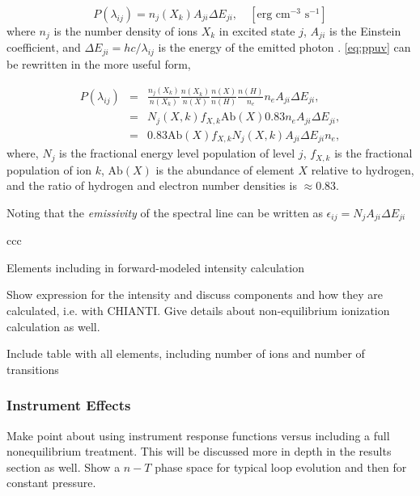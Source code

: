 \documentclass[modern,linenumbers]{aastex62}
\begin{document}
\begin{equation}
    \label{eq:ppuv}
    P(\lambda_{ij}) = n_j(X_k)A_{ji}\Delta E_{ji},\quad[\text{erg cm}^{-3}\text{ s}^{-1}]
\end{equation}
where $n_j$ is the number density of ions $X_k$ in excited state $j$, $A_{ji}$ is the Einstein coefficient, and $\Delta E_{ji}=hc/\lambda_{ij}$ is the energy of the emitted photon  \citep[see][]{mason_spectroscopic_1994,bradshaw_collisional_2013}. \autoref{eq:ppuv} can be rewritten in the more useful form,

\begin{eqnarray*}
    P(\lambda_{ij}) &=& \frac{n_j(X_k)}{n(X_k)}\frac{n(X_k)}{n(X)}\frac{n(X)}{n(H)}\frac{n(H)}{n_e}n_eA_{ji}\Delta E_{ji}, \\
    &=& N_j(X,k) f_{X,k} \mathrm{Ab}(X) 0.83 n_e A_{ji} \Delta E_{ji}, \\
    &=& 0.83 \mathrm{Ab}(X) f_{X,k} N_j(X,k) A_{ji} \Delta E_{ji} n_e,
\end{eqnarray*}
where, $N_j$ is the fractional energy level population of level $j$, $f_{X,k}$ is the fractional population of ion $k$, $\mathrm{Ab}(X)$ is the abundance of element $X$ relative to hydrogen, and the ratio of hydrogen and electron number densities is $\approx0.83$. 

Noting that the \textit{emissivity} of the spectral line can be written as $\epsilon_{ij}=N_j A_{ji} \Delta E_{ji}$
\begin{deluxetable}{ccc}
    \caption{Elements including in forward-modeled intensity calculation\label{tab:element_table}}
    \startdata
    \enddata
\end{deluxetable}

Show expression for the intensity and discuss components and how they are calculated, i.e. with CHIANTI. Give details about non-equilibrium ionization calculation as well.

Include table with all elements, including number of ions and number of transitions

\subsubsection{Instrument Effects}
\label{instrument}

Make point about using instrument response functions versus including a full nonequilibrium treatment. This will be discussed more in depth in the results section as well. Show a $n-T$ phase space for typical loop evolution and then for constant pressure.
\end{document}
